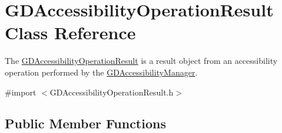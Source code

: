 \hypertarget{interface_g_d_accessibility_operation_result}{
\section{GDAccessibilityOperationResult Class Reference}
\label{interface_g_d_accessibility_operation_result}
}


The \hyperlink{interface_g_d_accessibility_operation_result}{GDAccessibilityOperationResult} is a result object from an accessibility operation performed by the \hyperlink{interface_g_d_accessibility_manager}{GDAccessibilityManager}.  


{\ttfamily \#import $<$GDAccessibilityOperationResult.h$>$}\subsection*{Public Member Functions}
